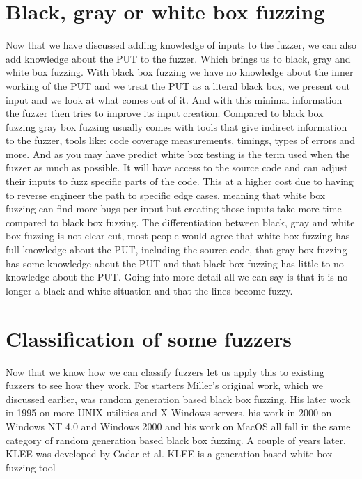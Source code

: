 \section{Black, gray or white box fuzzing}
Now that we have discussed adding knowledge of inputs to the fuzzer, we can also add knowledge about the PUT to the fuzzer. Which brings us to black, gray and white box fuzzing. With black box fuzzing we have no knowledge about the inner working of the PUT and we treat the PUT as a literal black box, we present out input and we look at what comes out of it. And with this minimal information the fuzzer then tries to improve its input creation. 
Compared to black box fuzzing gray box fuzzing usually comes with tools that give indirect information to the fuzzer, tools like: code coverage measurements, timings, types of errors and more.
And as you may have predict white box testing is the term used when the fuzzer as much as possible. It will have access to the source code and can adjust their inputs to fuzz specific parts of the code. This at a higher cost due to having to reverse engineer the path to specific edge cases, meaning that white box fuzzing can find more bugs per input but creating those inputs take more time compared to black box fuzzing.
The differentiation between black, gray and white box fuzzing is not clear cut, most people would agree that white box fuzzing has full knowledge about the PUT, including the source code, that gray box fuzzing has some knowledge about the PUT and that black box fuzzing has little to no knowledge about the PUT. Going into more detail all we can say is that it is no longer a black-and-white situation and that the lines become fuzzy. 


\section{Classification of some fuzzers}
Now that we know how we can classify fuzzers let us apply this to existing fuzzers to see how they work. For starters Miller's original work, which we discussed earlier, was random generation based black box fuzzing. His later work in 1995 on more UNIX utilities and X-Windows servers\cite{26miller1995fuzzrevisited}, his work in 2000 on Windows NT 4.0 and Windows 2000\cite{24MillerWindows} and his work on MacOS \cite{25MillerOnMacOS} all fall in the same category of random generation based black box fuzzing.
A couple of years later, KLEE was developed\cite{8KLEE} by Cadar et al. KLEE is a generation based white box fuzzing tool


